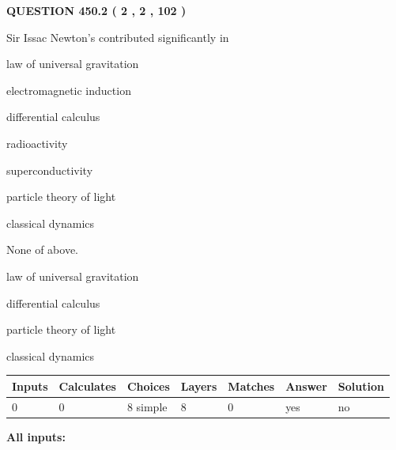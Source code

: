\documentclass[12pt]{article}
\begin{document}
\vspace{0.2in}
  
{\textbf{\Large{QUESTION
450.2 
 ( 2 , 2 , 102 )
}}}
  
  
Sir Issac Newton's contributed significantly in
 
 
law of universal gravitation
 
 
electromagnetic induction
 
 
differential calculus
 
 
radioactivity
 
 
superconductivity
 
 
particle theory of light
 
 
classical dynamics
 
 
 None of above.
 
 
\noindent{}
 
 
law of universal gravitation
 
 
differential calculus
 
 
particle theory of light
 
 
classical dynamics
 
 
\noindent{}
 
 
   
   
   
   
\noindent\begin{tabular}{|l|l|l|l|l|l|l|}
 \hline
Inputs & Calculates & Choices & Layers & Matches & Answer & Solution \\ \hline
 0  & 
 0  & 
 8
  simple  
  & 
 8  & 
 0  & 
  yes & 
  no 
  \\ \hline
 \end{tabular}
   
   
   
   
\noindent{}
   
   
   
   
\noindent\vspace{0.1in}\hspace{-0.08in} {\textbf{\Large{All inputs: }}}
   
\end{document}

